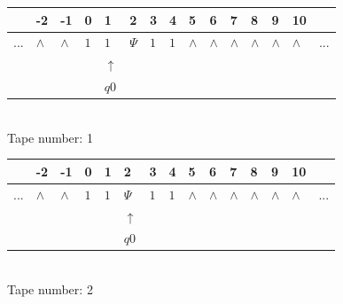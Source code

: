 \documentclass[11pt]{article}
\begin{document}
\begin{table}[H]
\centering
\begin{tabular}{lllllllllllllll}
 & -2 & -1 & 0 & 1 & 2 & 3 & 4 & 5 & 6 & 7 & 8 & 9 & 10 & \\
\hline
$...$ & \multicolumn{1}{|l|}{$\wedge$} & \multicolumn{1}{|l|}{$\wedge$} & \multicolumn{1}{|l|}{$1$} & \multicolumn{1}{|l|}{$1$} & \multicolumn{1}{|l|}{$\Psi$} & \multicolumn{1}{|l|}{$1$} & \multicolumn{1}{|l|}{$1$} & \multicolumn{1}{|l|}{$\wedge$} & \multicolumn{1}{|l|}{$\wedge$} & \multicolumn{1}{|l|}{$\wedge$} & \multicolumn{1}{|l|}{$\wedge$} & \multicolumn{1}{|l|}{$\wedge$} & \multicolumn{1}{|l|}{$\wedge$} & $...$\\
\hline
&  &  &  & $\uparrow$ &  &  &  &  &  &  &  &  &  &  \\
&  &  &  & $ q0 $ &  &  &  &  &  &  &  &  &  &  \\
\end{tabular}
\\
Tape number: 1
\noindent\makebox[\linewidth]{\hdashrule{\textwidth}{1pt}{1pt}}\end{table}

\begin{table}[H]
\centering
\begin{tabular}{lllllllllllllll}
 & -2 & -1 & 0 & 1 & 2 & 3 & 4 & 5 & 6 & 7 & 8 & 9 & 10 & \\
\hline
$...$ & \multicolumn{1}{|l|}{$\wedge$} & \multicolumn{1}{|l|}{$\wedge$} & \multicolumn{1}{|l|}{$1$} & \multicolumn{1}{|l|}{$1$} & \multicolumn{1}{|l|}{$\Psi$} & \multicolumn{1}{|l|}{$1$} & \multicolumn{1}{|l|}{$1$} & \multicolumn{1}{|l|}{$\wedge$} & \multicolumn{1}{|l|}{$\wedge$} & \multicolumn{1}{|l|}{$\wedge$} & \multicolumn{1}{|l|}{$\wedge$} & \multicolumn{1}{|l|}{$\wedge$} & \multicolumn{1}{|l|}{$\wedge$} & $...$\\
\hline
&  &  &  &  & $\uparrow$ &  &  &  &  &  &  &  &  &  \\
&  &  &  &  & $ q0 $ &  &  &  &  &  &  &  &  &  \\
\end{tabular}
\\
Tape number: 2
\noindent\makebox[\linewidth]{\hdashrule{\textwidth}{1pt}{1pt}}\end{table}
\end{document}
